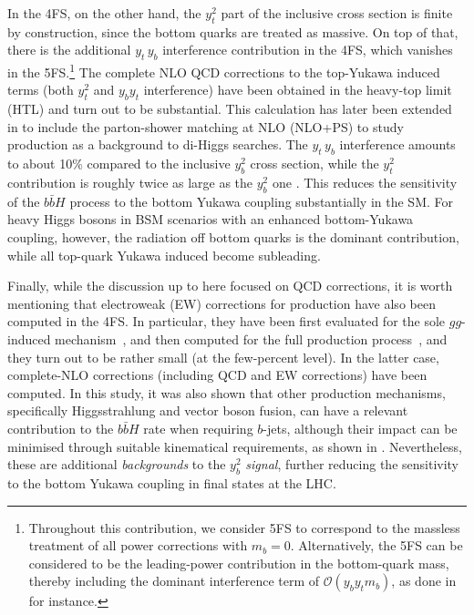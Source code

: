 \documentclass[11pt,a4paper]{article}
\begin{document}
In the 4FS, on the other hand, the $y_t^2$ part of the inclusive \bbH{} cross section is finite by construction, since the bottom quarks are treated as massive.
On top of that, there is the additional  $y_t\,y_b$ interference contribution in the 4FS, which vanishes in the 5FS.\footnote{Throughout this contribution, we consider 5FS to correspond to the massless treatment of all power corrections with $m_b=0$. Alternatively, the 5FS can be considered to be the leading-power contribution in the bottom-quark mass, thereby including the dominant interference term of $\mathcal{O}(y_by_tm_b)$, as done in  for instance.}
The complete NLO QCD corrections to the top-Yukawa induced terms (both $y_t^2$ and $y_b y_t$ interference) 
have been obtained in the heavy-top limit (HTL) \cite{deutschmann:2018avk} and turn out to be substantial. This calculation 
has later been extended in  to include the parton-shower matching at NLO (NLO+PS) to study 
\bbH{} production as a background to di-Higgs searches. 
The $y_t\,y_b$ interference amounts to about 10\% \cite{dittmaier:2003ej,dawson:2003kb} compared to the inclusive $y_b^2$ cross section, while the $y_t^2$ contribution is roughly twice as large as the $y_b^2$ one \cite{deutschmann:2018avk}.
This reduces the sensitivity of the $b\bar bH$ process to the bottom Yukawa coupling substantially in the SM.
For heavy Higgs bosons in BSM scenarios with an enhanced bottom-Yukawa coupling, however, the radiation off bottom quarks is the dominant contribution,
while all top-quark Yukawa induced become subleading.


Finally, while the discussion up to here focused on QCD corrections, it is worth mentioning that electroweak (EW) corrections for \bbH{} production have also been computed in the 4FS.
In particular, they have been first evaluated for the sole $gg$-induced mechanism~\cite{Zhang:2017mdz}, and then computed for the full production
process~\cite{Pagani:2020rsg}, and they turn out to be rather small (at the few-percent level). 
In the latter case, complete-NLO corrections (including QCD and EW corrections)
have been computed. In this study, it was also shown that other production mechanisms, specifically Higgsstrahlung and vector boson fusion, 
can have a relevant contribution to the $b\bar b H$ rate when requiring $b$-jets, although their impact can be minimised through
suitable kinematical requirements, as shown in . Nevertheless, these are additional \textit{backgrounds} to the $y_b^2$ \textit{signal}, 
further reducing the sensitivity to the bottom Yukawa coupling in \bbH{} final states at the LHC.
\end{document}
